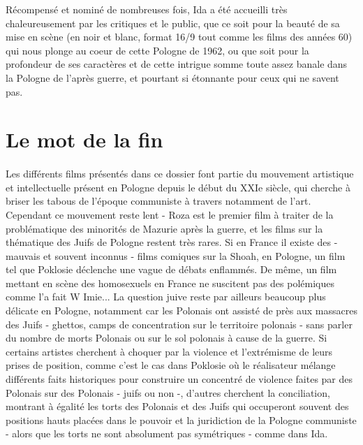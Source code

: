 \documentclass[12pt]{amsart}
\begin{document}
Récompensé et nominé de nombreuses fois, Ida a été accueilli très chaleureusement par les critiques et le public, que ce soit pour la beauté de sa mise en scène (en noir et blanc, format 16/9 tout comme les films des années 60) qui nous plonge au coeur de cette Pologne de 1962, ou que soit pour la profondeur de ses caractères et de cette intrigue somme toute assez banale dans la Pologne de l'après guerre, et pourtant si étonnante pour ceux qui ne savent pas.

\cleartoevenpage

\section*{Le mot de la fin}
\vspace*{10mm}
\paragraph*{}
Les différents films présentés dans ce dossier font partie du mouvement artistique et intellectuelle présent en Pologne depuis le début du XXIe siècle, qui cherche à briser les tabous de l'époque communiste à travers notamment de l'art. Cependant ce mouvement reste lent - Roza est le premier film à traiter de la problématique des minorités de Mazurie après la guerre, et les films sur la thématique des Juifs de Pologne restent très rares. Si en France il existe des -mauvais et souvent inconnus - films comiques sur la Shoah, en Pologne, un film tel que Poklosie déclenche une vague de débats enflammés. De même, un film mettant en scène des homosexuels en France ne suscitent pas des polémiques comme l'a fait W Imie... La question juive reste par ailleurs beaucoup plus délicate en Pologne, notamment car les Polonais ont assisté de près aux massacres des Juifs - ghettos, camps de concentration sur le territoire polonais - sans parler du nombre de morts Polonais ou sur le sol polonais à cause de la guerre. Si certains artistes cherchent à choquer par la violence et l'extrémisme de leurs prises de position, comme c'est le cas dans Poklosie où le réalisateur mélange différents faits historiques pour construire un concentré de violence faites par des Polonais sur des Polonais - juifs ou non -, d'autres cherchent la conciliation, montrant à égalité les torts des Polonais et des Juifs qui occuperont souvent des positions hauts placées dans le pouvoir et la juridiction de la Pologne communiste - alors que les torts ne sont absolument pas symétriques - comme dans Ida.
\end{document}
